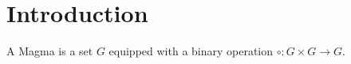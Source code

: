 \chapter{Introduction}

\begin{definition}\label{magma-def} A Magma is a set $G$ equipped with a binary operation $\circ: G \times G \to G$.
\end{definition}
